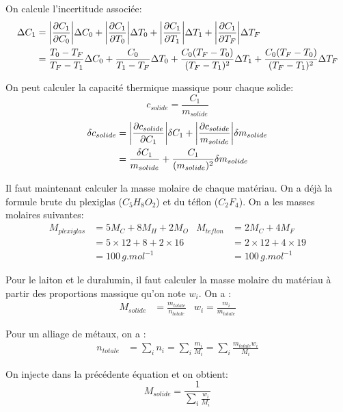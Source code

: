 \documentclass[12pt]{article}
\begin{document}
On calcule l'incertitude associée:
\begin{align*}
\Delta C_1 &= \abs{\frac{\partial C_1}{\partial C_0}} \Delta C_0 + \abs{\frac{\partial C_1}{\partial T_0}} \Delta T_0 + \abs{\frac{\partial C_1}{\partial T_1}} \Delta T_1 + \abs{\frac{\partial C_1}{\partial T_F}} \Delta T_F \\
&= \frac{T_0-T_F}{T_F-T_1}\Delta C_0 + \frac{C_0}{T_1-T_F} \Delta T_0 + \frac{C_0(T_F - T_0)}{(T_F-T_1)^2}\Delta T_1 + \frac{C_0(T_F - T_0)}{(T_F-T_1)^2}\Delta T_F
\end{align*}

On peut calculer la capacité thermique massique pour chaque solide:
\begin{equation}
c_{solide}=\frac{C_1}{m_{solide}}
\end{equation}
\begin{align*}
\delta c_{solide}&=\abs{\frac{\partial c_{solide}}{\partial C_1}}\delta C_1 + \abs{\frac{\partial c_{solide}}{m_{solide}}}\delta m_{solide} \\
&=\frac{\delta C_1}{m_{solide}}+ \frac{C_1}{(m_{solide})^2}\delta m_{solide}
\end{align*}

Il faut maintenant calculer la masse molaire de chaque matériau. On a déjà la formule brute du plexiglas ($C_5H_8O_2$) et du téflon ($C_2F_4$). On a les masses molaires suivantes:
\begin{align*}
M_{plexiglas}&=5M_C+8M_H+2M_O & M_{teflon}&=2M_C+4M_F  \\
&=5\times 12+8+2\times 16 & &=2\times 12+4\times 19 \\
&=100\, g.mol^{-1} & &=100\, g.mol^{-1}
\end{align*}

Pour le laiton et le duralumin, il faut calculer la masse molaire du matériau à partir des proportions massique qu'on note $w_{i}$. On a :
\begin{align*}
M_{solide}&=\frac{m_{totale}}{n_{totale}} & w_i=\frac{m_i}{m_{totale}}
\end{align*} 

Pour un alliage de métaux, on a :
\begin{align*}
n_{totale}&=\sum_{i}n_i
=\sum_i \frac{m_i}{M_i}
=\sum_i \frac{m_{totale}w_i}{M_i}
\end{align*}

On injecte dans la précédente équation et on obtient:
\begin{equation}
M_{solide}=\frac{1}{\sum_{i} \frac{w_i}{M_i}}
\end{equation}
\end{document}
